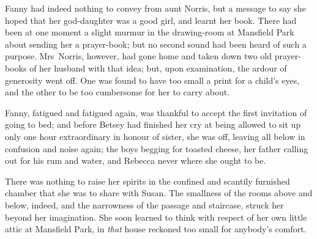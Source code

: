 Fanny had indeed nothing to convey from aunt Norris, but a message to say she hoped that her god-daughter was a good girl, and learnt her book. There had been at one moment a slight murmur in the drawing-room at Mansfield Park about sending her a prayer-book; but no second sound had been heard of such a purpose. Mrs~Norris, however, had gone home and taken down two old prayer-books of her husband with that idea; but, upon examination, the ardour of generosity went off. One was found to have too small a print for a child's eyes, and the other to be too cumbersome for her to carry about.

Fanny, fatigued and fatigued again, was thankful to accept the first invitation of going to bed; and before Betsey had finished her cry at being allowed to sit up only one hour extraordinary in honour of sister, she was off, leaving all below in confusion and noise again; the boys begging for toasted cheese, her father calling out for his rum and water, and Rebecca never where she ought to be.

There was nothing to raise her spirits in the confined and scantily furnished chamber that she was to share with Susan. The smallness of the rooms above and below, indeed, and the narrowness of the passage and staircase, struck her beyond her imagination. She soon learned to think with respect of her own little attic at Mansfield Park, in \textit{that}  house reckoned too small for anybody's comfort. 